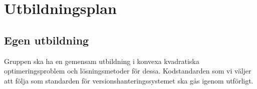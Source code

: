 \section{Utbildningsplan}

\subsection{Egen utbildning}
Gruppen ska ha en gemensam utbildning i konvexa kvadratiska optimeringsproblem och lösningsmetoder för dessa. Kodstandarden som vi väljer att följa som standarden för versionshanteringssystemet ska gås igenom utförligt.  